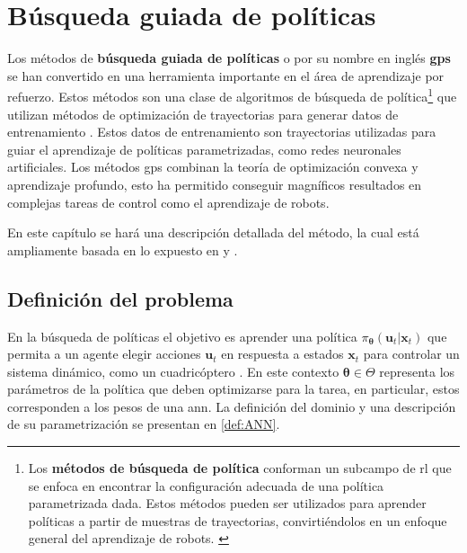 \chapter{Búsqueda guiada de políticas}
\label{chapter:model_based}

Los métodos de \textbf{búsqueda guiada de políticas} o por su nombre en inglés \textbf{\acrfull{gps}} se han convertido en una herramienta importante en el área de aprendizaje por refuerzo. Estos métodos son una clase de algoritmos de búsqueda de política\footnote{Los \textbf{métodos de búsqueda de política} conforman un subcampo de \acrshort{rl} que se enfoca en encontrar la configuración adecuada de una política parametrizada dada. Estos métodos pueden ser utilizados para aprender políticas a partir de muestras de trayectorias, convirtiéndolos en un enfoque general del aprendizaje de robots. \cite{PetersNeumann2015}} que utilizan métodos de optimización de trayectorias para generar datos de entrenamiento \cite{Du_2021}. Estos datos de entrenamiento son trayectorias utilizadas para guiar el aprendizaje de políticas parametrizadas, como redes neuronales artificiales. Los métodos \acrshort{gps} combinan la teoría de optimización convexa y aprendizaje profundo, esto ha permitido conseguir magníficos resultados en complejas tareas de control como el aprendizaje de robots. 

En este capítulo se hará una descripción detallada del método, la cual está ampliamente basada en lo expuesto en \cite{Schneider2018} y \cite{Deep_Visuomotor_Policies}.

\section{Definición del problema}

En la búsqueda de políticas el objetivo es aprender una política $\pi_{\bm\theta}(\mathbf{u}_t| \mathbf{x}_t)$ que permita a un agente elegir acciones $\mathbf{u}_t$ en respuesta a estados $\mathbf{x}_t$ para controlar un sistema dinámico, como un cuadricóptero \cite{Deep_Visuomotor_Policies}. En este contexto $\bm{\theta}\in\Theta$ representa los parámetros de la política que deben optimizarse para la tarea, en particular, estos corresponden a los pesos de una \acrshort{ann}. La definición del dominio y una descripción de su parametrización se presentan en \ref{def:ANN}.

